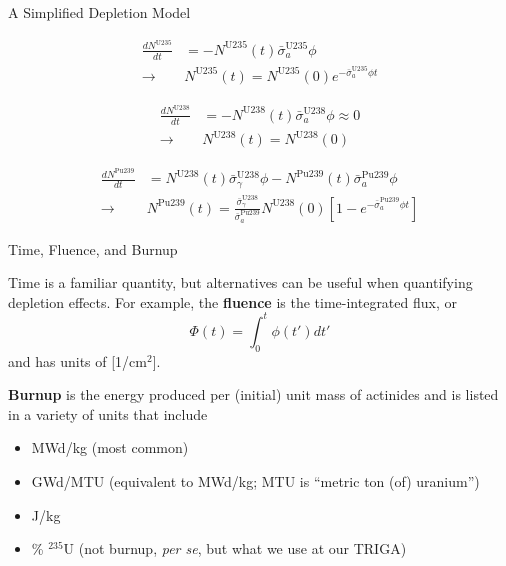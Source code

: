 \documentclass[aspectratio=1610]{beamer}
\begin{document}
\begin{frame}[fragile]{A Simplified Depletion Model}
 
\begin{equation*}
\tag{10.27 $\rightarrow$ 10.31}
\begin{split}
\frac{dN^{\text{U}235}}{dt} &=  -N^{\text{U}235}(t) \bar{\sigma}^{\text{U}235}_a \phi \\
 \longrightarrow \, & \boxed{N^{\text{U}235}(t) = N^{\text{U}235}(0) e^{-\bar{\sigma}^{\text{U}235}_a \phi t}} 
\end{split}
\end{equation*}

\begin{equation*}
\tag{10.27 $\rightarrow$  10.34}
\begin{split}
\frac{dN^{\text{U}238}}{dt} &= -N^{\text{U}238}(t) \bar{\sigma}^{\text{U}238}_a \phi \approx 0 \\
 \longrightarrow \, & \boxed{N^{\text{U}238}(t) = N^{\text{U}238}(0)}
\end{split}
\end{equation*}

\begin{equation*}
\tag{10.30 $\rightarrow$  10.37}
\begin{split}
\frac{dN^{\text{Pu}239}}{dt} &=  
 N^{\text{U}238}(t) \bar{\sigma}^{\text{U}238}_{\gamma} \phi 
 - N^{\text{Pu}239}(t) \bar{\sigma}^{\text{Pu}239}_a \phi \\
\longrightarrow \, & \boxed{N^{\text{Pu}239}(t) 
  = \frac{\bar{\sigma}^{\text{U}238}_{\gamma}}{\bar{\sigma}^{\text{Pu}239}_a} 
    N^{\text{U}238}(0) \left [1 - e^{-\bar{\sigma}^{\text{Pu}239}_a \phi t} \right ]}
\end{split}    
\end{equation*}


\end{frame}



\begin{frame}[fragile]{Time, Fluence, and Burnup}
 
Time is a familiar quantity, but alternatives can be useful when quantifying depletion effects.  For example, the
{\bf fluence} is the time-integrated flux, or
$$
   \Phi(t) = \int^t_0 \phi(t')dt' 
$$
and has units of [1/cm$^2$].

\vfill 


{\bf Burnup} is the energy produced per (initial) unit mass of actinides
and is listed in a variety of units that include
\begin{itemize}
 \item MWd/kg  (most common)
 \item GWd/MTU (equivalent to MWd/kg; MTU is ``metric ton (of) uranium'')
 \item J/kg
 \item \% ${}^{235}$U (not burnup, {\it per se}, but what we use at our TRIGA) 
\end{itemize}


\end{frame}
\end{document}
